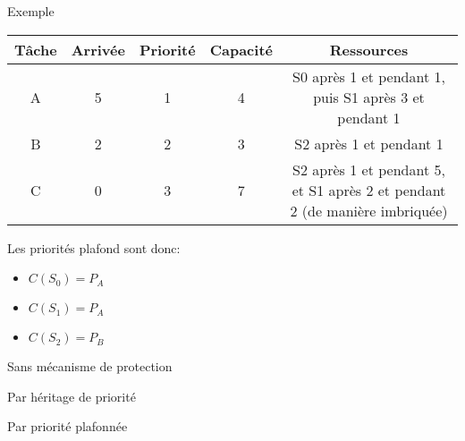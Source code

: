 \begin{frame}{Exemple}
  \begin{center}
    \begin{tabular}{ccccc}
      \hline
      Tâche & Arrivée & Priorité & Capacité & Ressources \\
      \hline
      A & 5 & 1 & 4 & S0 après 1 et pendant 1, puis S1 après 3 et pendant 1\\
      B & 2 & 2 & 3 & S2 après 1 et pendant 1 \\
      C & 0 & 3 & 7 & S2 après 1 et pendant 5, et S1 après 2 et pendant 2 (de manière imbriquée)\\
      \hline
    \end{tabular}
  \end{center}
  Les priorités plafond sont donc: 
  \begin{itemize}
  \item $C(S_0) = P_A$ 
  \item $C(S_1) = P_A$ 
  \item $C(S_2) = P_B$ 
  \end{itemize}
\end{frame} 

\begin{frame}{Sans mécanisme de protection}
\end{frame} 

\begin{frame}{Par héritage de priorité}
\end{frame} 

\begin{frame}{Par priorité plafonnée}
\end{frame} 

